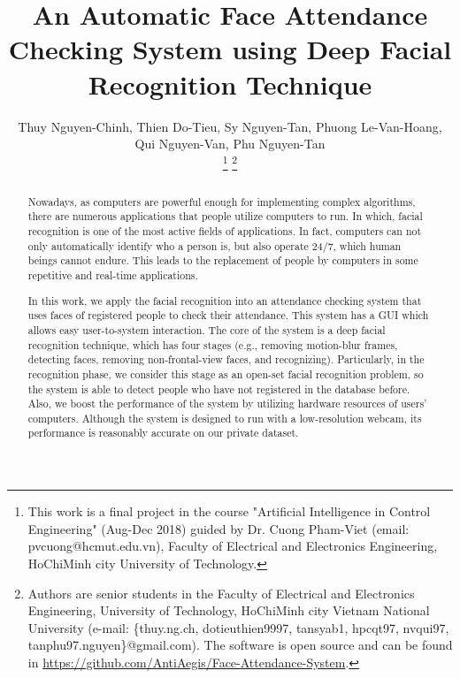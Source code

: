 \documentclass[journal, twocolumn]{IEEEtran}
\begin{document}
\title{An Automatic Face Attendance Checking System using Deep Facial Recognition Technique}


\author{Thuy Nguyen-Chinh,
		Thien Do-Tieu,
		Sy Nguyen-Tan,
		Phuong Le-Van-Hoang,
		Qui Nguyen-Van,
		Phu Nguyen-Tan

\thanks{This work is a final project in the course "Artificial Intelligence in Control Engineering" (Aug-Dec 2018) guided by Dr. Cuong Pham-Viet (email: pvcuong@hcmut.edu.vn), Faculty of Electrical and Electronics Engineering, HoChiMinh city University of Technology.}
\thanks{Authors are senior students in the Faculty of Electrical and Electronics Engineering, University of Technology, HoChiMinh city Vietnam National University (e-mail: \{thuy.ng.ch, dotieuthien9997, tansyab1, hpcqt97, nvqui97, tanphu97.nguyen\}@gmail.com). The software is open source and can be found in \url{https://github.com/AntiAegis/Face-Attendance-System}.}
}


\maketitle


\begin{abstract}
Nowadays, as computers are powerful enough for implementing complex algorithms, there are numerous applications that people utilize computers to run. In which, facial recognition is one of the most active fields of applications. In fact, computers can not only automatically identify who a person is, but also operate 24/7, which human beings cannot endure. This leads to the replacement of people by computers in some repetitive and real-time applications.

In this work, we apply the facial recognition into an attendance checking system that uses faces of registered people to check their attendance. This system has a GUI which allows easy user-to-system interaction. The core of the system is a deep facial recognition technique, which has four stages (e.g., removing motion-blur frames, detecting faces, removing non-frontal-view faces, and recognizing). Particularly, in the recognition phase, we consider this stage as an open-set facial recognition problem, so the system is able to detect people who have not registered in the database before. Also, we boost the performance of the system by utilizing hardware resources of users' computers. Although the system is designed to run with a low-resolution webcam, its performance is reasonably accurate on our private dataset.
\end{abstract}
\end{document}
